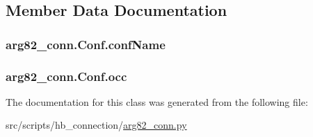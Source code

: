 \subsection{Member Data Documentation}
\hypertarget{classarg82__conn_1_1_conf_a5deba118eecc268ec28a4a6a50fb94e7}{
\subsubsection[{conf\-Name}]{\setlength{\rightskip}{0pt plus 5cm}arg82\-\_\-conn.\-Conf.\-conf\-Name}}\label{classarg82__conn_1_1_conf_a5deba118eecc268ec28a4a6a50fb94e7}
\hypertarget{classarg82__conn_1_1_conf_a5697a79bbdd586706897f5b170bfe3eb}{
\subsubsection[{occ}]{\setlength{\rightskip}{0pt plus 5cm}arg82\-\_\-conn.\-Conf.\-occ}}\label{classarg82__conn_1_1_conf_a5697a79bbdd586706897f5b170bfe3eb}


The documentation for this class was generated from the following file\-:\begin{DoxyCompactItemize}
\item 
src/scripts/hb\-\_\-connection/\hyperlink{arg82__conn_8py}{arg82\-\_\-conn.\-py}\end{DoxyCompactItemize}
